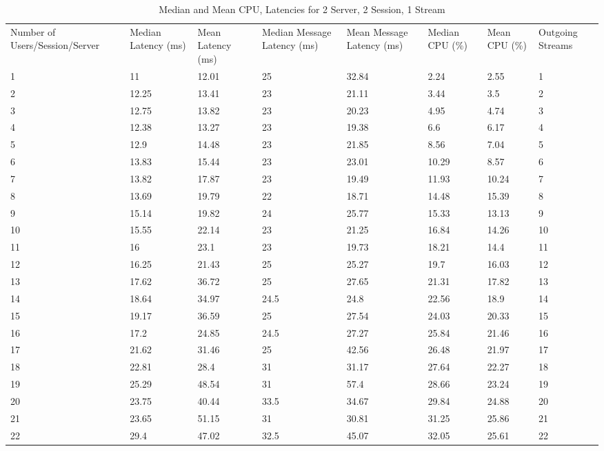 \begin{table}
\caption{Median and Mean CPU, Latencies for 2 Server, 2 Session, 1 Stream}
\label{table:2serv_2sess_1str}
\begin{tabu} to\linewidth{|X[c]|X[c]|X[c]|X[c]|X[c]|X[c]|X[c]|X[c]|}
\everyrow{\hline}
\hline
Number of Users/Session/Server & Median Latency (ms) & Mean Latency (ms) & Median Message Latency (ms) & Mean Message Latency (ms) & Median CPU (\%) & Mean CPU (\%) & Outgoing Streams\\
1 & 11 & 12.01 & 25 & 32.84 & 2.24 & 2.55 & 1 \\
2 & 12.25 & 13.41 & 23 & 21.11 & 3.44 & 3.5 & 2 \\
3 & 12.75 & 13.82 & 23 & 20.23 & 4.95 & 4.74 & 3 \\
4 & 12.38 & 13.27 & 23 & 19.38 & 6.6 & 6.17 & 4 \\
5 & 12.9 & 14.48 & 23 & 21.85 & 8.56 & 7.04 & 5 \\
6 & 13.83 & 15.44 & 23 & 23.01 & 10.29 & 8.57 & 6 \\
7 & 13.82 & 17.87 & 23 & 19.49 & 11.93 & 10.24 & 7 \\
8 & 13.69 & 19.79 & 22 & 18.71 & 14.48 & 15.39 & 8 \\
9 & 15.14 & 19.82 & 24 & 25.77 & 15.33 & 13.13 & 9 \\
10 & 15.55 & 22.14 & 23 & 21.25 & 16.84 & 14.26 & 10 \\
11 & 16 & 23.1 & 23 & 19.73 & 18.21 & 14.4 & 11 \\
12 & 16.25 & 21.43 & 25 & 25.27 & 19.7 & 16.03 & 12 \\
13 & 17.62 & 36.72 & 25 & 27.65 & 21.31 & 17.82 & 13 \\
14 & 18.64 & 34.97 & 24.5 & 24.8 & 22.56 & 18.9 & 14 \\
15 & 19.17 & 36.59 & 25 & 27.54 & 24.03 & 20.33 & 15 \\
16 & 17.2 & 24.85 & 24.5 & 27.27 & 25.84 & 21.46 & 16 \\
17 & 21.62 & 31.46 & 25 & 42.56 & 26.48 & 21.97 & 17 \\
18 & 22.81 & 28.4 & 31 & 31.17 & 27.64 & 22.27 & 18 \\
19 & 25.29 & 48.54 & 31 & 57.4 & 28.66 & 23.24 & 19 \\
20 & 23.75 & 40.44 & 33.5 & 34.67 & 29.84 & 24.88 & 20 \\
21 & 23.65 & 51.15 & 31 & 30.81 & 31.25 & 25.86 & 21 \\
22 & 29.4 & 47.02 & 32.5 & 45.07 & 32.05 & 25.61 & 22 \\

\end{tabu}
\end{table}
